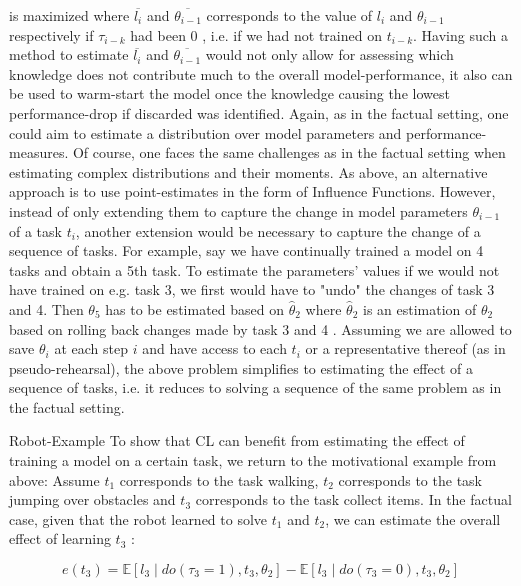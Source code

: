 \documentclass[10pt]{article}
\begin{document}
is maximized where $\overline{l_{i}}$ and $\overline{\theta_{i-1}}$ corresponds to the value of $l_{i}$ and $\theta_{i-1}$ respectively if $\tau_{i-k}$ had been 0 , i.e. if we had not trained on $t_{i-k}$. Having such a method to estimate $\overline{l_{i}}$ and $\overline{\theta_{i-1}}$ would not only allow for assessing which knowledge does not contribute much to the overall model-performance, it also can be used to warm-start the model once the knowledge causing the lowest performance-drop if discarded was identified. Again, as in the factual setting, one could aim to estimate a distribution over model parameters and performance-measures. Of course, one faces the same challenges as in the factual setting when estimating complex distributions and their moments. As above, an alternative approach is to use point-estimates in the form of Influence Functions. However, instead of only extending them to capture the change in model parameters $\theta_{i-1}$ of a task $t_{i}$, another extension would be necessary to capture the change of a sequence of tasks. For example, say we have continually trained a model on 4 tasks and obtain a 5th task. To estimate the parameters' values if we would not have trained on e.g. task 3, we first would have to "undo" the changes of task 3 and 4. Then $\theta_{5}$ has to be estimated based on $\hat{\theta}_{2}$ where $\hat{\theta}_{2}$ is an estimation of $\theta_{2}$ based on rolling back changes made by task 3 and 4 . Assuming we are allowed to save $\theta_{i}$ at each step $i$ and have access to each $t_{i}$ or a representative thereof (as in pseudo-rehearsal), the above problem simplifies to estimating the effect of a sequence of tasks, i.e. it reduces to solving a sequence of the same problem as in the factual setting.

Robot-Example To show that CL can benefit from estimating the effect of training a model on a certain task, we return to the motivational example from above: Assume $t_{1}$ corresponds to the task walking, $t_{2}$ corresponds to the task jumping over obstacles and $t_{3}$ corresponds to the task collect items. In the factual case, given that the robot learned to solve $t_{1}$ and $t_{2}$, we can estimate the overall effect of learning $t_{3}$ :

$$
e\left(t_{3}\right)=\mathbb{E}\left[l_{3} \mid d o\left(\tau_{3}=1\right), t_{3}, \theta_{2}\right]-\mathbb{E}\left[l_{3} \mid d o\left(\tau_{3}=0\right), t_{3}, \theta_{2}\right]
$$
\end{document}
